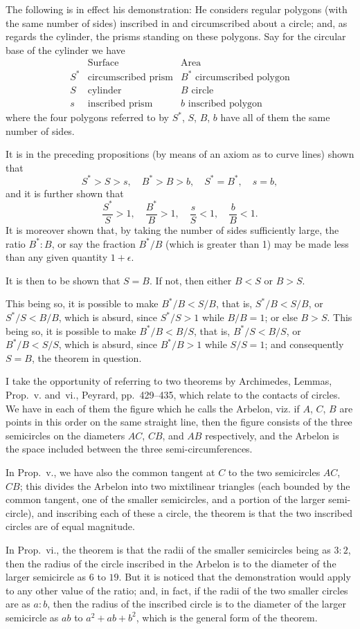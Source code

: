 \documentclass[11pt,a4paper]{article}
\theoremstyle{definition}
\theoremstyle{remark}
\begin{document}
The following is in effect his demonstration: He considers regular polygons (with the same number of sides) inscribed in and circumscribed about a circle; and, as regards the cylinder, the prisms standing on these polygons. Say for the circular base of the cylinder we have
\[
\begin{array}{c|c|c}
& \text{Surface} & \text{Area} \\ \hline
S^* & \text{circumscribed prism} & B^* \text{ circumscribed polygon} \\
S & \text{cylinder} & B \text{ circle} \\
s & \text{inscribed prism} & b \text{ inscribed polygon}
\end{array}
\]
where the four polygons referred to by $S^*$, $S$, $B$, $b$ have all of them the same number of sides.

It is in the preceding propositions (by means of an axiom as to curve lines) shown that
\[
S^* > S > s, \quad B^* > B > b, \quad S^* = B^*, \quad s = b,
\]
and it is further shown that
\[
\frac{S^*}{S} > 1, \quad \frac{B^*}{B} > 1, \quad \frac{s}{S} < 1, \quad \frac{b}{B} < 1.
\]
It is moreover shown that, by taking the number of sides sufficiently large, the ratio $B^* : B$, or say the fraction $B^*/B$ (which is greater than 1) may be made less than any given quantity $1 + \epsilon$.

It is then to be shown that $S = B$. If not, then either $B < S$ or $B > S$.

This being so, it is possible to make $B^*/B < S/B$, that is, $S^*/B < S/B$, or $S^*/S < B/B$, which is absurd, since $S^*/S > 1$ while $B/B = 1$; or else $B > S$. This being so, it is possible to make $B^*/B < B/S$, that is, $B^*/S < B/S$, or $B^*/B < S/S$, which is absurd, since $B^*/B > 1$ while $S/S = 1$; and consequently $S = B$, the theorem in question.

I take the opportunity of referring to two theorems by Archimedes, Lemmas, Prop.~v. and~vi., Peyrard, pp.~429--435, which relate to the contacts of circles. We have in each of them the figure which he calls the Arbelon, viz. if $A$, $C$, $B$ are points in this order on the same straight line, then the figure consists of the three semicircles on the diameters $AC$, $CB$, and $AB$ respectively, and the Arbelon is the space included between the three semi-circumferences.

In Prop.~v., we have also the common tangent at $C$ to the two semicircles $AC$, $CB$; this divides the Arbelon into two mixtilinear triangles (each bounded by the common tangent, one of the smaller semicircles, and a portion of the larger semi-circle), and inscribing each of these a circle, the theorem is that the two inscribed circles are of equal magnitude.

In Prop.~vi., the theorem is that the radii of the smaller semicircles being as $3:2$, then the radius of the circle inscribed in the Arbelon is to the diameter of the larger semicircle as $6$ to $19$. But it is noticed that the demonstration would apply to any other value of the ratio; and, in fact, if the radii of the two smaller circles are as $a:b$, then the radius of the inscribed circle is to the diameter of the larger semicircle as $ab$ to $a^2 + ab + b^2$, which is the general form of the theorem.
\end{document}
